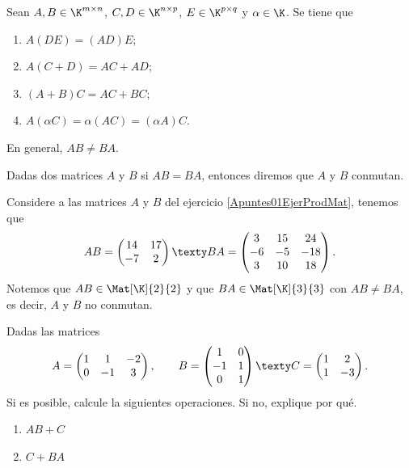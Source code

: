 \documentclass[compacto,10pt]{pubciencias-notas}
\begin{document}
\begin{teo} 
Sean $A, B\in \K^{m \times n}$, $C,D\in \K^{n \times p}$, $E\in \K^{p \times q}$ y $\alpha \in\K$. Se tiene que
\begin{enumerate}
\item[$a)$] $A(DE) = (AD)E$;
\item[$b)$] $A(C+D) = AC + AD$; 
\item[$c)$] $(A+B)C = AC + BC$;
\item[$d)$] $A(\alpha C) = \alpha (AC) = (\alpha A) C$.
\end{enumerate}
\end{teo}

\begin{advertencia}
    En general, $AB\neq BA$.
\end{advertencia}

\begin{obs}
Dadas dos matrices $A$ y $B$ si $AB = BA$, entonces diremos que $A$ y $B$ conmutan.
\end{obs}

\begin{ejem}\hspace{0pt} Considere a las matrices $A$ y $B$ del ejercicio \ref{Apuntes01EjerProdMat}, tenemos que
\[
    AB = \begin{pmatrix}14&17\\-7&2\end{pmatrix}
    \texty
    BA = \begin{pmatrix}3&15&24\\-6&-5&-18\\3&10&18\end{pmatrix}.
\]
Notemos que $AB\in\Mat[\K]{2}{2}$ y que $BA\in\Mat[\K]{3}{3}$ con $AB \neq BA$, es decir, $A$ y $B$ no conmutan.
\end{ejem}

\begin{ejer}\hspace{0pt} Dadas las matrices
\[
    A = \begin{pmatrix}1&1&-2\\0&-1&3\end{pmatrix} ,
    \qquad
    B = \begin{pmatrix}1&0\\-1&1\\0&1\end{pmatrix}
    \texty
    C 
    = \begin{pmatrix}1&2\\1&-3\end{pmatrix}.
\]
Si es posible, calcule la siguientes operaciones. Si no, explique por qué.
\begin{enumerate}
    \item [$a)$] $AB+C$
    \item [$b)$] $C+BA$
\end{enumerate}
\end{ejer}
\end{document}
